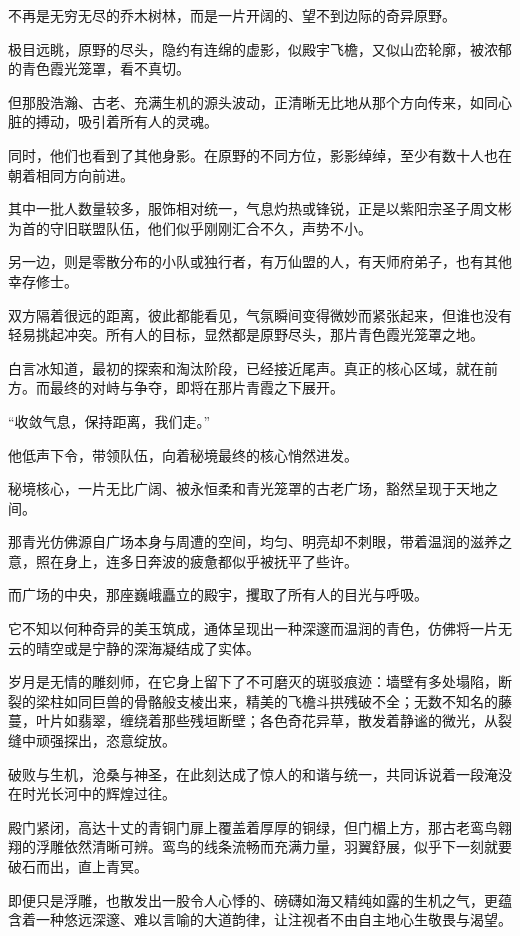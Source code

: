 不再是无穷无尽的乔木树林，而是一片开阔的、望不到边际的奇异原野。

极目远眺，原野的尽头，隐约有连绵的虚影，似殿宇飞檐，又似山峦轮廓，被浓郁的青色霞光笼罩，看不真切。

但那股浩瀚、古老、充满生机的源头波动，正清晰无比地从那个方向传来，如同心脏的搏动，吸引着所有人的灵魂。

同时，他们也看到了其他身影。在原野的不同方位，影影绰绰，至少有数十人也在朝着相同方向前进。

其中一批人数量较多，服饰相对统一，气息灼热或锋锐，正是以紫阳宗圣子周文彬为首的守旧联盟队伍，他们似乎刚刚汇合不久，声势不小。

另一边，则是零散分布的小队或独行者，有万仙盟的人，有天师府弟子，也有其他幸存修士。

双方隔着很远的距离，彼此都能看见，气氛瞬间变得微妙而紧张起来，但谁也没有轻易挑起冲突。所有人的目标，显然都是原野尽头，那片青色霞光笼罩之地。

白言冰知道，最初的探索和淘汰阶段，已经接近尾声。真正的核心区域，就在前方。而最终的对峙与争夺，即将在那片青霞之下展开。

“收敛气息，保持距离，我们走。”

他低声下令，带领队伍，向着秘境最终的核心悄然进发。

\vspace{2em}

秘境核心，一片无比广阔、被永恒柔和青光笼罩的古老广场，豁然呈现于天地之间。

那青光仿佛源自广场本身与周遭的空间，均匀、明亮却不刺眼，带着温润的滋养之意，照在身上，连多日奔波的疲惫都似乎被抚平了些许。

而广场的中央，那座巍峨矗立的殿宇，攫取了所有人的目光与呼吸。

它不知以何种奇异的美玉筑成，通体呈现出一种深邃而温润的青色，仿佛将一片无云的晴空或是宁静的深海凝结成了实体。

岁月是无情的雕刻师，在它身上留下了不可磨灭的斑驳痕迹：墙壁有多处塌陷，断裂的梁柱如同巨兽的骨骼般支棱出来，精美的飞檐斗拱残破不全；无数不知名的藤蔓，叶片如翡翠，缠绕着那些残垣断壁；各色奇花异草，散发着静谧的微光，从裂缝中顽强探出，恣意绽放。

破败与生机，沧桑与神圣，在此刻达成了惊人的和谐与统一，共同诉说着一段淹没在时光长河中的辉煌过往。

殿门紧闭，高达十丈的青铜门扉上覆盖着厚厚的铜绿，但门楣上方，那古老鸾鸟翱翔的浮雕依然清晰可辨。鸾鸟的线条流畅而充满力量，羽翼舒展，似乎下一刻就要破石而出，直上青冥。

即便只是浮雕，也散发出一股令人心悸的、磅礴如海又精纯如露的生机之气，更蕴含着一种悠远深邃、难以言喻的大道韵律，让注视者不由自主地心生敬畏与渴望。

